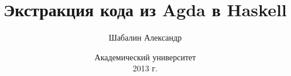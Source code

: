 \documentclass{beamer}
\title{Экстракция кода из Agda в Haskell}
\author{Шабалин Александр}
\institute{{\tiny научный руководитель}\\ \vspace{.10cm}доц. Москвин Д. Н.}
\date{\scriptsize Академический университет\\ \vspace{.10cm}2013 г.}
\begin{document}
\frame{\titlepage}


\end{document}
